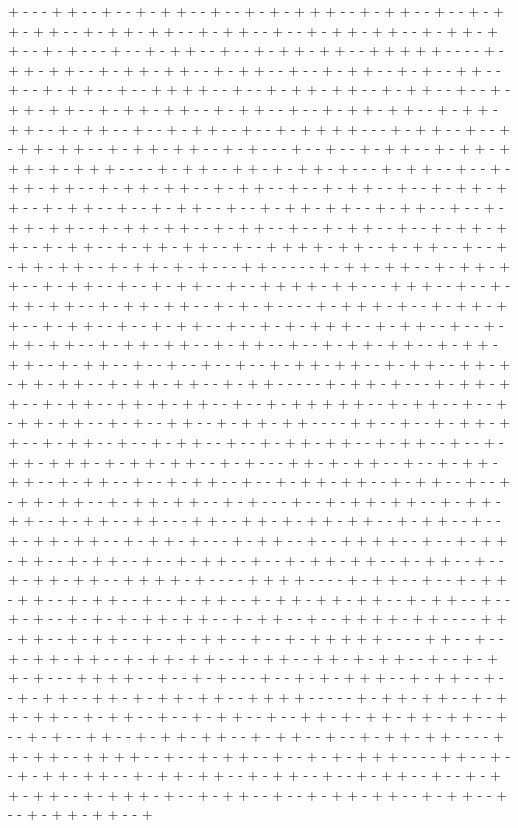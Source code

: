 + - - - + + - - + - - + - + + - - + - - + - + - + + + - - + - + + - - + - - + - + + - + + - - + - + + - + + - - + - + + - - + - - + - + + - + + - - + - + + - + + - - + - + - - - + - - + - + + - - + - - + - + + - + + - - + + + + + - - - - + - + + - + + - - + - + + - + + - - + - + + - - + - - + - + + - - + - + - - + + - - + - - + - + + - - + - - + + + + - - + - - + - + + - + + - - + - + + - - + - - + - + + - + + - - + - + + - + + - - + - + + - - + - - + - + + - + + - - + - + + - + + - - + - + + - - + - - + - + + - - + - - + - + + + + - - - + - + + - - + - - + - + + - + + - - + - + + - + + - - + - + - - - + - - + - - + - + + - - + - + + - + + + - + - + + + - - - - + - + + - - + + - + - + + - + - - - + - + + - - + - - + - + + - + + - - + - + + - + + - - + - + + - - + - - + - + + - - + - - + - + + - + + - - + - + + - - + - - + - + + - - + - - + - + + - + + - - + - + + - - + - - + - + + - + + - - + - + + - + + - - + - + + - - + - - + - + + - - + - - + - + + - + + - - + - + + - - + - + + - + + - - + - - + + + + - + + - - + - + + - - + - - + - + + - + + - - + - + + - + - + - - - + + - - - - - + - + + - + + - - + - + + - + + - - + - + + - - + - - + - + + - - + - - + + + + - + + - - - + + + - - + - - + - + + - + + - - + - + + - + + - - + - + - + - - - - + - + + + - + - - + - + + - + + - - + - + + - - + - - + - + + - - + - - + - + - + + + - - + - + + - - + - - + - + + - + + - - + - + + - + + - - + - + + - - + - - + - + + - + + - - + - + + - + + - - + - + + - - + - - + - - + - - + - - + - + + - + + - - + - + + - - + + - + - + + - + + - - + - + + - + + - - + - + + - - - - - + - + + - + - - - + - + + - + + - - + - + + - - + + - + - + + - - + - - + - + + + + + - - + - + + - - + - - + - + + - + + - - + - + - - + + - - + - + + - + + - - - - + + - - + - - + - + + - + + - - + - + + - - + - - + - + + - - + - - + - + + - + + - - + - + + - - + - - + - + + - + + + - + - + + - + + - - + - + - - - + + - + - + + - - + - - + - + + - + + - - + - + + - - + - - + - + + - - + - - + - + + - + + - - + - + + - - + - - + - + + - + + - - + - + + - + + - - + - + - - - + - - + - + + - + + - - + - + + - + + - - + - + + - - + + - - - + + - - + + - + - + + - + + - - + - + + - - + - - + - + + - + + - - + - + + - + - - - + - + + - - + - - + + + + - - + - - + - + + - + + - - + - + + - - + - - + - + + - - + - - + - + + - + + - - + - + + - - + - - + - + + - + + - - + + + + - + - - - - + + + + - - - - + - + + - - + - - + - + + - + + - - + - + + - - + - - + - + + - - + - + + - + + - + + - - + - + + - - + - - + - + - - + - + - + - + + - + + - - + - + + - - + - - + + + + - + + - - - - + + - + + - - + - + + - - + - - + - + + - - + - - + - + + + + + - - - - + + - - + - - + - + + - + + - - + - + + - + + - - + - + + - - + + - + - + + - - + - - + - + + - + - - - + + + + - - + - - + - + - - - + - - + - + - + + + - - + - + + - - + - - + - + + - - + + - + - + + - + + - - + + + + - - - - - + - + + - + + - - + - + + - + + - - + - + + - - + - - + - + + - - + - - + + - + - + + - + + - + + - - + - - + - + - - + + - - + - + + - + + - - + - + + - - + - - + - + + - + + - - - - + + - + + - - + + + + - - + - - + - + + - - + - - + - + - + + + - - - - + + - - + - - + - + + - + + - - + - + + - + + - - + - + + - - + - - + - + + - - + - - + - + + - + + - - + - + + + - + - - + - + + - - + - - + - + + - + + - - + - + + - - + - - + - + + - + + - - + 